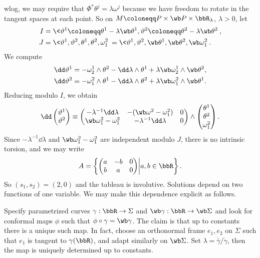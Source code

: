 \begin{example}
    \gls{wlog}, we may require that $\Phi^\ast\theta^j=\lambda\omega^j$ because we have freedom to rotate in the tangent spaces at each point. So on $M\coloneqq P\times \wb P\times \bbR_\lambda$, $\lambda>0$, let 
    \begin{align}
        I&=\<\vartheta^1\coloneqq \theta^1-\lambda\wb\theta^1,\vartheta^2\coloneqq \theta^2-\lambda\wb\theta^2\>,\\
        J&=\<\vartheta^1,\vartheta^2,\theta^1,\theta^2,\omega^2_1\>=\<\vartheta^1,\vartheta^2,\wb\theta^1,\wb\theta^2,\wb\omega^2_1\>.
    \end{align}
    We compute 
    \begin{align}
        \dd \vartheta^1 &= -\omega^1_2\wedge \theta^2-\dd\lambda\wedge\theta^1+\lambda\wb\omega^1_2\wedge\wb\theta^2,\\
        \dd\vartheta^2&=-\omega^2_1\wedge\theta^1-\dd\lambda\wedge\theta^2+\lambda\wb\omega^2_1\wedge \wb\theta^1.
    \end{align}
    Reducing modulo $I$, we obtain 
    \[\dd\begin{pmatrix}
        \vartheta^1\\
        \vartheta^2
    \end{pmatrix}
    \equiv 
    \begin{pmatrix}
        -\lambda^{-1}\dd\lambda & -(\wb\omega^2-\omega^2_1) & 0\\
        \wb\omega^2_1 -\omega^2_1 & -\lambda^{-1}\dd\lambda & 0
    \end{pmatrix}
    \wedge 
    \begin{pmatrix}
        \theta^1\\\theta^2\\\omega^2_1
    \end{pmatrix}.
    \]
    Since $-\lambda^{-1}\dd\lambda$ and $\wb\omega^2_1-\omega^2_1$ are independent modulo $J$, there is no intrinsic torsion, and we may write 
    \[A=\left\{
        \begin{pmatrix}
            a & -b & 0\\
            b & a & 0
        \end{pmatrix}
        \middle| a,b\in\bbR
    \right\}.\]
    So $(s_1,s_2)=(2,0)$ and the tableau is involutive. Solutions depend on two functions of one variable. We may make this dependence explicit as follows.

    Specify parametrized curves $\gamma:\bbR\to \Sigma$ and $\wb\gamma:\bbR\to \wb\Sigma$ and look for conformal maps $\phi$ such that $\phi\circ \gamma=\wb\gamma$. The claim is that up to constants there is a unique such map. In fact, choose an orthonormal frame $e_1,e_2$ on $\Sigma$ such that $e_1$ is tangent to $\gamma(\bbR)$, and adapt similarly on $\wb\Sigma$. Set $\lambda=\dot{\bar\gamma}/\dot\gamma$, then the map is uniquely determined up to constants.


\end{example}
